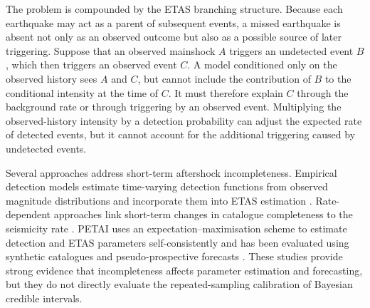 \documentclass{statsmsc}
\begin{document}
The problem is compounded by the ETAS branching structure. Because each
earthquake may act as a parent of subsequent events, a missed earthquake is
absent not only as an observed outcome but also as a possible source of later
triggering. Suppose that an observed mainshock \(A\) triggers an undetected
event \(B\), which then triggers an observed event \(C\). A model conditioned
only on the observed history sees \(A\) and \(C\), but cannot include the
contribution of \(B\) to the conditional intensity at the time of \(C\). It
must therefore explain \(C\) through the background rate or through triggering
by an observed event. Multiplying the observed-history intensity by a
detection probability can adjust the expected rate of detected events, but it cannot account for the additional triggering caused by undetected events.

Several approaches address short-term aftershock incompleteness. Empirical
detection models estimate time-varying detection functions from observed
magnitude distributions and incorporate them into ETAS estimation
\citep{omi2014}. Rate-dependent approaches link short-term changes in
catalogue completeness to the seismicity rate \citep{hainzl2016}. PETAI uses
an expectation--maximisation scheme to estimate detection and ETAS parameters
self-consistently and has been evaluated using synthetic catalogues and
pseudo-prospective forecasts \citep{mizrahi2021}. These studies provide strong
evidence that incompleteness affects parameter estimation and forecasting, but
they do not directly evaluate the repeated-sampling calibration of Bayesian
credible intervals.
\end{document}
